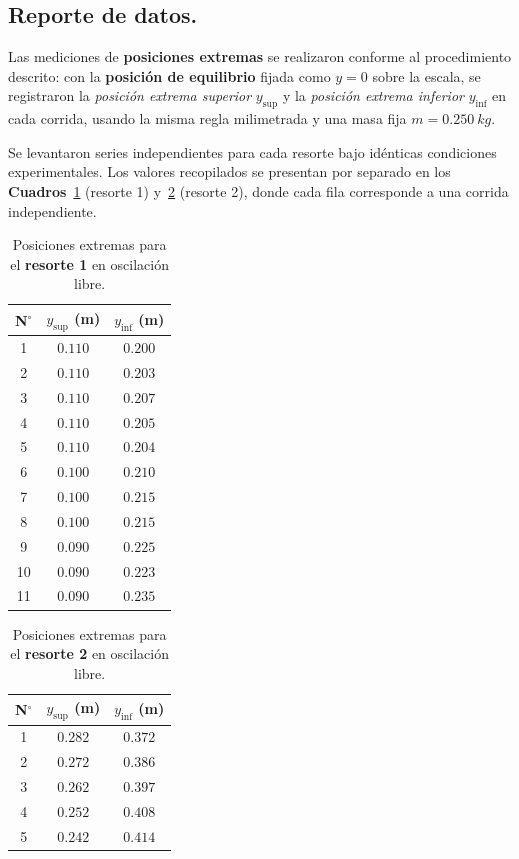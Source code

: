 \documentclass[11pt,twocolumn]{article}
\begin{document}
\subsection{Reporte de datos.}

Las mediciones de \textbf{posiciones extremas} se realizaron conforme al procedimiento descrito: con la \textbf{posición de equilibrio} fijada como $y=0$ sobre la escala, se registraron la \emph{posición extrema superior} $y_{\text{sup}}$ y la \emph{posición extrema inferior} $y_{\text{inf}}$ en cada corrida, usando la misma regla milimetrada y una masa fija $m=\SI{0.250}{kg}$. 

Se levantaron series independientes para cada resorte bajo idénticas condiciones experimentales. Los valores recopilados se presentan por separado en los \textbf{Cuadros}~\ref{tab:oscilaciones_resorte1_parte2} (resorte 1) y~\ref{tab:oscilaciones_resorte2_parte2} (resorte 2), donde cada fila corresponde a una corrida independiente.

\begin{table}
\centering
\caption{Posiciones extremas para el \textbf{resorte 1} en oscilación libre.}
\label{tab:oscilaciones_resorte1_parte2}
\begin{tabular}{|c|c|c|}
\hline
\textbf{N$^\circ$} & $y_{\text{sup}}$ (m) & $y_{\text{inf}}$ (m) \\ \hline
1  & $0.110$ & $0.200$ \\ \hline
2  & $0.110$ & $0.203$ \\ \hline
3  & $0.110$ & $0.207$ \\ \hline
4  & $0.110$ & $0.205$ \\ \hline
5  & $0.110$ & $0.204$ \\ \hline
6  & $0.100$ & $0.210$ \\ \hline
7  & $0.100$ & $0.215$ \\ \hline
8  & $0.100$ & $0.215$ \\ \hline
9  & $0.090$ & $0.225$ \\ \hline
10 & $0.090$ & $0.223$ \\ \hline
11 & $0.090$ & $0.235$ \\ \hline
\end{tabular}
\end{table}

\begin{table}
\centering
\caption{Posiciones extremas para el \textbf{resorte 2} en oscilación libre.}
\label{tab:oscilaciones_resorte2_parte2}
\begin{tabular}{|c|c|c|}
\hline
\textbf{N$^\circ$} & $y_{\text{sup}}$ (m) & $y_{\text{inf}}$ (m) \\ \hline
1 & $0.282$ & $0.372$ \\ \hline
2 & $0.272$ & $0.386$ \\ \hline
3 & $0.262$ & $0.397$ \\ \hline
4 & $0.252$ & $0.408$ \\ \hline
5 & $0.242$ & $0.414$ \\ \hline
\end{tabular}
\end{table}
\end{document}
